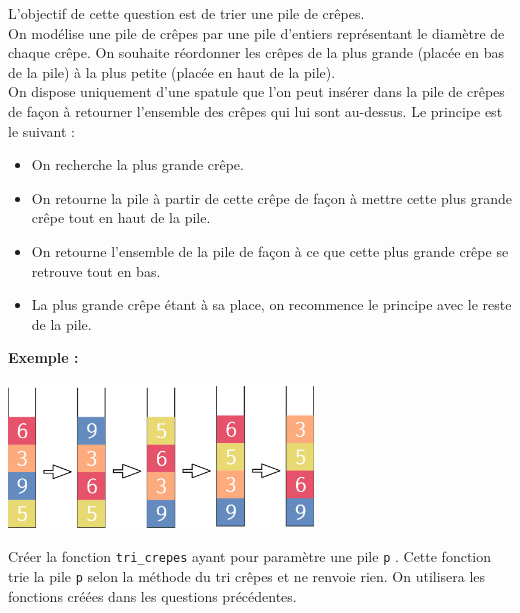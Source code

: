 \documentclass[a4paper,12pt,eval,firamath]{nsi}
\begin{document}
\question L'objectif de cette question est de trier une pile de crêpes.\\
On modélise une pile de crêpes par une pile d'entiers représentant le diamètre de chaque crêpe. On souhaite réordonner les crêpes de la plus grande (placée en bas de la pile) à la plus petite (placée en
haut de la pile).\\
On dispose uniquement d'une spatule que l'on peut insérer dans la pile de crêpes de façon à retourner
l'ensemble des crêpes qui lui sont au-dessus.
Le principe est le suivant :
\begin{itemize}
      \item On recherche la plus grande crêpe.
      \item On retourne la pile à partir de cette crêpe de façon à mettre cette plus grande crêpe tout en haut de la pile.
      \item On retourne l'ensemble de la pile de façon à ce que cette plus grande crêpe se retrouve tout en bas.
      \item La plus grande crêpe étant à sa place, on recommence le principe avec le reste de la pile.
\end{itemize}
\textbf{Exemple : }

\begin{center}
      \includegraphics[width=8.1cm]{img/pile3.png}
\end{center}

Créer la fonction \texttt{tri_crepes} ayant pour paramètre une pile \texttt{p} . Cette fonction trie la pile \texttt{p}  selon la
méthode du tri crêpes et ne renvoie rien. On utilisera les fonctions créées dans les questions précédentes.\\
\end{document}
